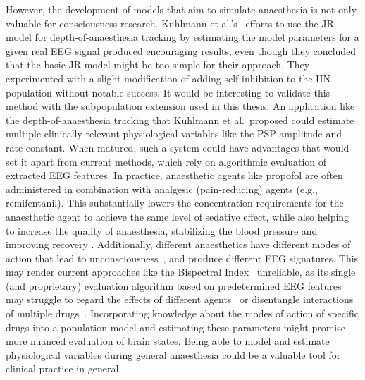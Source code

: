 However, the development of models that aim to simulate anaesthesia is not only valuable for consciousness research.
Kuhlmann et al.'s~\cite{kuhlmann_neural_2016} efforts to use the JR model for depth-of-anaesthesia tracking
by estimating the model parameters for a given real EEG signal produced encouraging results,
even though they concluded that the basic JR model might be too simple for their approach.
They experimented with a slight modification of adding self-inhibition to the IIN population without notable success.
It would be interesting to validate this method with the subpopulation extension used in this thesis.
An application like the depth-of-anaesthesia tracking that Kuhlmann et al.\ proposed
could estimate multiple clinically relevant physiological variables like the PSP amplitude and rate constant.
When matured, such a system could have advantages that would set it apart from current methods,
which rely on algorithmic evaluation of extracted EEG features.
In practice, anaesthetic agents like propofol are often administered in combination with analgesic (pain-reducing)
agents (e.g., remifentanil).
This substantially lowers the concentration requirements for the anaesthetic agent to achieve the same level of
sedative effect,
while also helping to increase the quality of anaesthesia, stabilizing the blood pressure and improving recovery
\cite{chen_propofol_2021}.
Additionally, different anaesthetics have different modes of action that
lead to unconsciousness~\cite{tantirigama_perspective_2020},
and produce different EEG signatures.
This may render current approaches like the Bispectral Index~\cite{mathur_bispectral_2022}
unreliable,
as its single (and proprietary) evaluation algorithm based on predetermined EEG features
may struggle to regard the effects of different agents~\cite{avidan_prevention_2011}
or disentangle interactions of multiple drugs~\cite{kuhlmann_neural_2016}.
Incorporating knowledge about the modes of action of specific drugs into a population model
and estimating these parameters might promise more nuanced evaluation of brain states.
Being able to model and estimate physiological variables during general anaesthesia
could be a valuable tool for clinical practice in general.

